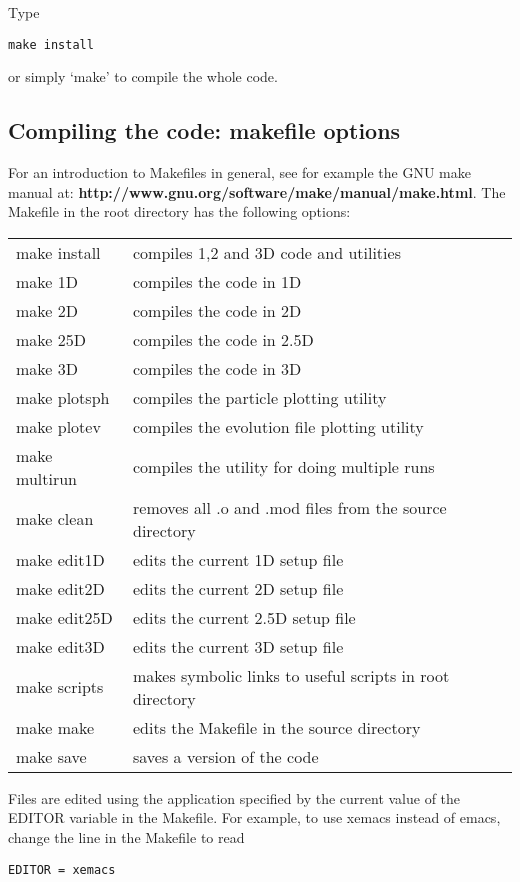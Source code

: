 \documentclass[a4paper,12pt]{article}
\begin{document}
\noindent Type
\begin{verbatim}
make install
\end{verbatim}
or simply `make' to compile the whole
code. 

\subsection{Compiling the code: makefile options}
For an introduction to Makefiles in general, see for example the GNU make manual
at: \textbf{http://www.gnu.org/software/make/manual/make.html}. The Makefile in
the root directory has
the following options:
\begin{table}[!h]
\begin{tabular}{ll}
\hline
make install & compiles 1,2 and 3D code and utilities \\
make 1D & compiles the code in 1D \\
make 2D & compiles the code in 2D \\
make 25D & compiles the code in 2.5D \\
make 3D & compiles the code in 3D \\
make plotsph & compiles the particle plotting utility \\
make plotev & compiles the evolution file plotting utility \\
make multirun & compiles the utility for doing multiple runs \\
make clean & removes all .o and .mod files from the source directory \\
make edit1D & edits the current 1D setup file \\
make edit2D & edits the current 2D setup file \\
make edit25D & edits the current 2.5D setup file \\
make edit3D & edits the current 3D setup file \\
make scripts & makes symbolic links to useful scripts in root directory \\
make make &  edits the Makefile in the source directory \\
make save & saves a version of the code \\
\hline
\end{tabular}
\end{table}

Files are edited using the application specified by the current value of the
EDITOR variable in the Makefile. For example, to use xemacs instead of emacs, change the line in
the Makefile to read
\begin{verbatim}
EDITOR = xemacs
\end{verbatim}
\end{document}
